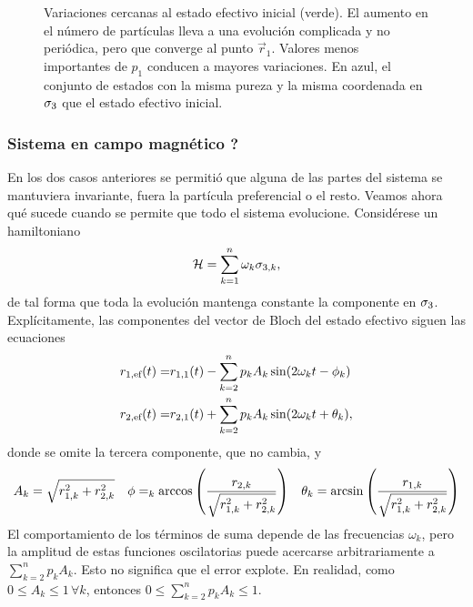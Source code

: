 \begin{figure}[ht!]
\begin{subfigure}{0.5\textwidth}
    \end{subfigure}
    \caption{Variaciones cercanas al estado efectivo inicial (verde). El aumento en el número de partículas lleva a una evolución complicada y no periódica, pero que converge al punto $\vec{r}_{1}$. Valores menos importantes de $p_{1}$ conducen a mayores variaciones. En azul, el conjunto de estados con la misma pureza y la misma coordenada en $\sigma_{3}$ que el estado efectivo inicial.}\label{fig:PrefInv2}
\end{figure}

\subsubsection{Sistema en campo magnético ?}


En los dos casos anteriores se permitió que alguna de las partes del sistema se mantuviera invariante, fuera la partícula preferencial o el resto. Veamos ahora qué sucede cuando se permite que todo el sistema evolucione. Considérese un hamiltoniano
\begin{equation}
    \mathcal{H}=\sum_{k=1}^{n}\omega_{k}\sigma_{3,k},\nonumber
\end{equation}
de tal forma que toda la evolución mantenga constante la componente en $\sigma_{3}$. Explícitamente, las componentes del vector de Bloch del estado efectivo siguen las ecuaciones
\begin{align}
    r_{1,\text{ef}}(t)=&r_{1,1}(t)-\sum_{k=2}^{n}p_{k}A_{k}\sin(2\omega_{k} t-\phi_{k})\nonumber\\
    r_{2,\text{ef}}(t)=&r_{2,1}(t)+\sum_{k=2}^{n}p_{k}A_{k}\sin(2\omega_{k} t+\theta_{k}),\nonumber
\end{align}
donde se omite la tercera componente, que no cambia, y
\begin{align}
    A_{k}=\sqrt{r_{1,k}^{2}+r_{2,k}^{2}} & & \phi=_{k}\arccos\qty(\frac{r_{2,k}}{\sqrt{r_{1,k}^{2}+r_{2,k}^{2}}}) & & \theta_{k}=\arcsin\qty(\frac{r_{1,k}}{\sqrt{r_{1,k}^{2}+r_{2,k}^{2}}})\nonumber
\end{align}
El comportamiento de los términos de suma depende de las frecuencias $\omega_{k}$, pero la amplitud de estas funciones oscilatorias puede acercarse arbitrariamente a $\sum_{k=2}^{n} p_{k} A_{k}$. Esto no significa que el error explote. En realidad, como $0\leq A_{k}\leq 1\,\forall k$, entonces $0\leq\sum_{k=2}^{n} p_{k} A_{k}\leq 1$. 


